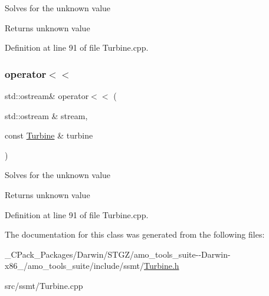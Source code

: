 Solves for the unknown value

\begin{DoxyReturn}{Returns}
unknown value 
\end{DoxyReturn}


Definition at line 91 of file Turbine.\+cpp.

\mbox{\label{class_turbine_a9c58dbc00958ac1b59a59fa3785e86bd}} 
\subsubsection{\texorpdfstring{operator$<$$<$}{operator<<}\hspace{0.1cm}{\footnotesize\ttfamily [3/3]}}
{\footnotesize\ttfamily std\+::ostream\& operator$<$$<$ (\begin{DoxyParamCaption}\item[{std\+::ostream \&}]{stream,  }\item[{const \hyperlink{class_turbine}{Turbine} \&}]{turbine }\end{DoxyParamCaption})\hspace{0.3cm}{\ttfamily [friend]}}

Solves for the unknown value

\begin{DoxyReturn}{Returns}
unknown value 
\end{DoxyReturn}


Definition at line 91 of file Turbine.\+cpp.



The documentation for this class was generated from the following files\+:\begin{DoxyCompactItemize}
\item 
\+\_\+\+C\+Pack\+\_\+\+Packages/\+Darwin/\+S\+T\+G\+Z/amo\+\_\+tools\+\_\+suite-\/-\/\+Darwin-\/x86\+\_/amo\+\_\+tools\+\_\+suite/include/ssmt/\hyperlink{___c_pack___packages_2_darwin_2_s_t_g_z_2amo__tools__suite--_darwin-x86__64_2amo__tools__suite_2include_2ssmt_2_turbine_8h}{Turbine.\+h}\item 
src/ssmt/Turbine.\+cpp\end{DoxyCompactItemize}
